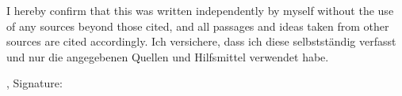 \cleardoublepage{}

\thispagestyle{empty}
\vspace*{0.8\textheight}
\noindent
\makeatletter
{}
{I hereby confirm that this \MakeLowercase{\getDoctype{}} was written independently by myself without the use of any sources beyond those cited, and all passages and ideas taken from other sources are cited accordingly.}
{Ich versichere, dass ich diese \getDoctype{} selbstständig verfasst und nur die angegebenen Quellen und Hilfsmittel verwendet habe.}
\makeatother

\vspace{15mm}
\noindent
\getSubmissionLocation{}, \getSubmissionDate{} \hspace{50mm} Signature:

\cleardoublepage{}
